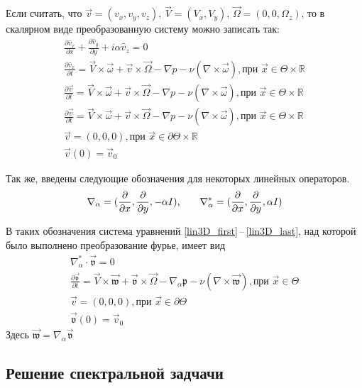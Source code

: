 Если считать, что $\vec v = (v_x, v_y, v_z)$, $\vec V = (V_x, V_y)$, $\vec \Omega = (0, 0, \Omega_z)$, то в скалярном виде преобразованную систему можно записать так:
\begin{gather} 
  \label{scalar3D_first}
 \frac{\partial \hat v_x}{\partial x} + \frac{\partial \hat v_y}{\partial y} + i\alpha \hat v_z= 0\\
% 
 \frac{\partial \hat v_x}{\partial t} = \vec V \times \vec \omega + \vec v \times \vec \Omega - \nabla p - \nu ( \nabla \times \vec \omega ), \text{при } \vec x \in \Theta \times \mathbb{R}\\
% 
 \frac{\partial \vec v}{\partial t} = \vec V \times \vec \omega + \vec v \times \vec \Omega - \nabla p - \nu ( \nabla \times \vec \omega ), \text{при } \vec x \in \Theta \times \mathbb{R}\\
% 
 \frac{\partial \vec v}{\partial t} = \vec V \times \vec \omega + \vec v \times \vec \Omega - \nabla p - \nu ( \nabla \times \vec \omega ), \text{при } \vec x \in \Theta \times \mathbb{R}\\
% 
 \vec v = (0,0,0), \text{при } \vec x \in \partial \Theta \times \mathbb{R} \\
 \vec v (0) = \vec v _0 
  \label{scalar3D_last}
\end{gather}
\fi

Так же, введены следующие обозначения для некоторых линейных операторов.
$$
  \nabla_\alpha = (\frac{\partial}{\partial x},\frac{\partial}{\partial y},-\alpha I)\text{,\qquad} 
  \nabla_\alpha^* = (\frac{\partial}{\partial x},\frac{\partial}{\partial y},\alpha I) 
$$

В таких обозначения система уравнений \ref{lin3D_first}\,--\,\ref{lin3D_last}, над которой было выполнено преобразование фурье, имеет вид
\begin{gather} 
  \label{ft3D_first}
  \nabla_\alpha^* \cdot  \mathfrak{\vec v} = 0\\
  \frac{\partial \mathfrak{\vec v}}{\partial t} = \vec V \times \mathfrak{\vec w} + \mathfrak{\vec v} \times \vec \Omega - 
		\nabla_\alpha \mathfrak{p} - \nu ( \nabla \times \mathfrak{\vec w} ), \text{при } \vec x \in \Theta\\
  \vec v = (0,0,0), \text{при } \vec x \in \partial \Theta\\
  \mathfrak{\vec v} (0) = \vec v _0 \label{ft3D_last}
\end{gather}
Здесь $\mathfrak{\vec w} = \nabla_\alpha \mathfrak{\vec v}$ 

\subsection{Решение спектральной задчачи}

